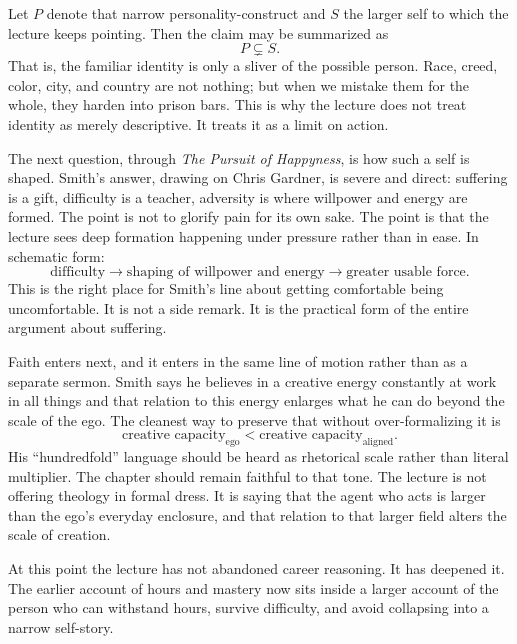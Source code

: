 Let \(P\) denote that narrow personality-construct and \(S\) the larger self to which the lecture keeps pointing. Then the claim may be summarized as
\begin{equation}
P \subsetneq S.
\end{equation}
That is, the familiar identity is only a sliver of the possible person. Race, creed, color, city, and country are not nothing; but when we mistake them for the whole, they harden into prison bars. This is why the lecture does not treat identity as merely descriptive. It treats it as a limit on action.

The next question, through \emph{The Pursuit of Happyness}, is how such a self is shaped. Smith's answer, drawing on Chris Gardner, is severe and direct: suffering is a gift, difficulty is a teacher, adversity is where willpower and energy are formed. The point is not to glorify pain for its own sake. The point is that the lecture sees deep formation happening under pressure rather than in ease. In schematic form:
\begin{equation}
\text{difficulty}
\longrightarrow
\text{shaping of willpower and energy}
\longrightarrow
\text{greater usable force}.
\end{equation}
This is the right place for Smith's line about getting comfortable being uncomfortable. It is not a side remark. It is the practical form of the entire argument about suffering.

Faith enters next, and it enters in the same line of motion rather than as a separate sermon. Smith says he believes in a creative energy constantly at work in all things and that relation to this energy enlarges what he can do beyond the scale of the ego. The cleanest way to preserve that without over-formalizing it is
\begin{equation}
\text{creative capacity}_{\mathrm{ego}}
<
\text{creative capacity}_{\mathrm{aligned}}.
\end{equation}
His ``hundredfold'' language should be heard as rhetorical scale rather than literal multiplier. The chapter should remain faithful to that tone. The lecture is not offering theology in formal dress. It is saying that the agent who acts is larger than the ego's everyday enclosure, and that relation to that larger field alters the scale of creation.

At this point the lecture has not abandoned career reasoning. It has deepened it. The earlier account of hours and mastery now sits inside a larger account of the person who can withstand hours, survive difficulty, and avoid collapsing into a narrow self-story.

